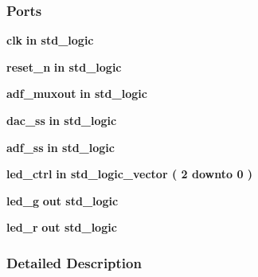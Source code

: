 \subsubsection*{Ports}
 \begin{DoxyCompactItemize}
\item 
{\bf clk}  {\bfseries {\bfseries \textcolor{keywordflow}{in}\textcolor{vhdlchar}{ }}} {\bfseries \textcolor{comment}{std\+\_\+logic}\textcolor{vhdlchar}{ }} 
\item 
{\bf reset\+\_\+n}  {\bfseries {\bfseries \textcolor{keywordflow}{in}\textcolor{vhdlchar}{ }}} {\bfseries \textcolor{comment}{std\+\_\+logic}\textcolor{vhdlchar}{ }} 
\item 
{\bf adf\+\_\+muxout}  {\bfseries {\bfseries \textcolor{keywordflow}{in}\textcolor{vhdlchar}{ }}} {\bfseries \textcolor{comment}{std\+\_\+logic}\textcolor{vhdlchar}{ }} 
\item 
{\bf dac\+\_\+ss}  {\bfseries {\bfseries \textcolor{keywordflow}{in}\textcolor{vhdlchar}{ }}} {\bfseries \textcolor{comment}{std\+\_\+logic}\textcolor{vhdlchar}{ }} 
\item 
{\bf adf\+\_\+ss}  {\bfseries {\bfseries \textcolor{keywordflow}{in}\textcolor{vhdlchar}{ }}} {\bfseries \textcolor{comment}{std\+\_\+logic}\textcolor{vhdlchar}{ }} 
\item 
{\bf led\+\_\+ctrl}  {\bfseries {\bfseries \textcolor{keywordflow}{in}\textcolor{vhdlchar}{ }}} {\bfseries \textcolor{comment}{std\+\_\+logic\+\_\+vector}\textcolor{vhdlchar}{ }\textcolor{vhdlchar}{(}\textcolor{vhdlchar}{ }\textcolor{vhdlchar}{ } \textcolor{vhdldigit}{2} \textcolor{vhdlchar}{ }\textcolor{keywordflow}{downto}\textcolor{vhdlchar}{ }\textcolor{vhdlchar}{ } \textcolor{vhdldigit}{0} \textcolor{vhdlchar}{ }\textcolor{vhdlchar}{)}\textcolor{vhdlchar}{ }} 
\item 
{\bf led\+\_\+g}  {\bfseries {\bfseries \textcolor{keywordflow}{out}\textcolor{vhdlchar}{ }}} {\bfseries \textcolor{comment}{std\+\_\+logic}\textcolor{vhdlchar}{ }} 
\item 
{\bf led\+\_\+r}  {\bfseries {\bfseries \textcolor{keywordflow}{out}\textcolor{vhdlchar}{ }}} {\bfseries \textcolor{comment}{std\+\_\+logic}\textcolor{vhdlchar}{ }} 
\end{DoxyCompactItemize}


\subsubsection{Detailed Description}



